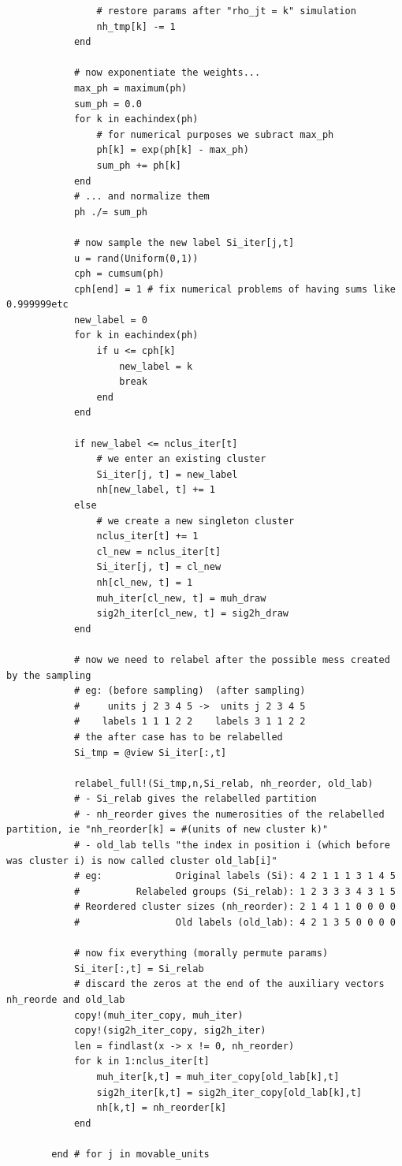 \documentclass[12pt,	%
	a4paper,		%
	twoside,		%
	openright,		%
	titlepage,%
	]{book}
\theoremstyle{definition}
\newenvironment{code}{\captionsetup{type=listing}}{}
\begin{document}
\begin{code}
\begin{verbatim}
				# restore params after "rho_jt = k" simulation
				nh_tmp[k] -= 1
			end

			# now exponentiate the weights...
			max_ph = maximum(ph)
			sum_ph = 0.0
			for k in eachindex(ph)
				# for numerical purposes we subract max_ph
				ph[k] = exp(ph[k] - max_ph)
				sum_ph += ph[k]
			end
			# ... and normalize them
			ph ./= sum_ph
			
			# now sample the new label Si_iter[j,t]
			u = rand(Uniform(0,1))
			cph = cumsum(ph)
			cph[end] = 1 # fix numerical problems of having sums like 0.999999etc
			new_label = 0
			for k in eachindex(ph)
				if u <= cph[k]
					new_label = k
					break
				end
			end
			
			if new_label <= nclus_iter[t]
				# we enter an existing cluster
				Si_iter[j, t] = new_label
				nh[new_label, t] += 1
			else
				# we create a new singleton cluster
				nclus_iter[t] += 1
				cl_new = nclus_iter[t]
				Si_iter[j, t] = cl_new
				nh[cl_new, t] = 1
				muh_iter[cl_new, t] = muh_draw
				sig2h_iter[cl_new, t] = sig2h_draw
			end

			# now we need to relabel after the possible mess created by the sampling
			# eg: (before sampling)  (after sampling)
			#     units j 2 3 4 5 ->  units j 2 3 4 5
			#    labels 1 1 1 2 2    labels 3 1 1 2 2
			# the after case has to be relabelled
			Si_tmp = @view Si_iter[:,t]

			relabel_full!(Si_tmp,n,Si_relab, nh_reorder, old_lab)				
			# - Si_relab gives the relabelled partition
			# - nh_reorder gives the numerosities of the relabelled partition, ie "nh_reorder[k] = #(units of new cluster k)"
			# - old_lab tells "the index in position i (which before was cluster i) is now called cluster old_lab[i]"
			# eg:             Original labels (Si): 4 2 1 1 1 3 1 4 5 
			#          Relabeled groups (Si_relab): 1 2 3 3 3 4 3 1 5
			# Reordered cluster sizes (nh_reorder): 2 1 4 1 1 0 0 0 0
			# 	              Old labels (old_lab): 4 2 1 3 5 0 0 0 0 

			# now fix everything (morally permute params)
			Si_iter[:,t] = Si_relab
			# discard the zeros at the end of the auxiliary vectors nh_reorde and old_lab
			copy!(muh_iter_copy, muh_iter)
			copy!(sig2h_iter_copy, sig2h_iter)
			len = findlast(x -> x != 0, nh_reorder)
			for k in 1:nclus_iter[t]
				muh_iter[k,t] = muh_iter_copy[old_lab[k],t]
				sig2h_iter[k,t] = sig2h_iter_copy[old_lab[k],t]
				nh[k,t] = nh_reorder[k]
			end

		end # for j in movable_units


\end{verbatim}
\end{code}
\end{document}
